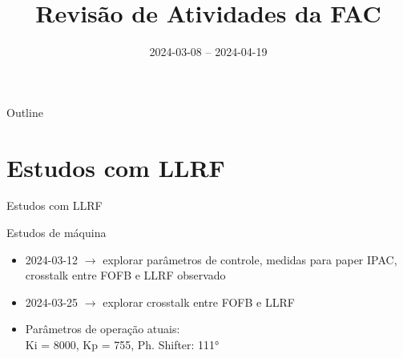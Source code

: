 \documentclass[1610]{beamer}					  %
\title{Revisão de Atividades da FAC}	%
\institute{LNLS.DAC.FAC}				%
\date{2024-03-08 -- 2024-04-19}			%
\begin{document}
\begin{frame}
  \titlepage
  \href{https://github.com/lnls-fac/doc-review-dac-fac}{}
  \href{https://www.overleaf.com/read/sbdjxtzfchrm}{}
\end{frame}

\begin{frame}{Outline}
  \tableofcontents
\end{frame}



\section{Estudos com LLRF}

\begin{frame}
    \Huge{Estudos com LLRF}
\end{frame}

\begin{frame}{Estudos de máquina}
\begin{itemize}
    \item 2024-03-12 $\to$ explorar parâmetros de controle, medidas para paper IPAC, crosstalk entre FOFB e LLRF observado
    \item 2024-03-25 $\to$ explorar crosstalk entre FOFB e LLRF

    \item Parâmetros de operação atuais: \\
    Ki = 8000, Kp = 755, Ph. Shifter: 111°
\end{itemize}
\end{frame}
\end{document}
